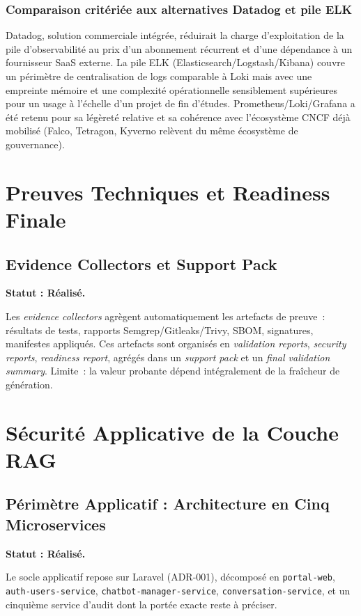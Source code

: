 \subsubsection{Comparaison critériée aux alternatives Datadog et pile ELK}
Datadog, solution commerciale intégrée, réduirait la charge d'exploitation de la pile d'observabilité au prix d'un abonnement récurrent et d'une dépendance à un fournisseur SaaS externe. La pile ELK (Elasticsearch/Logstash/Kibana) couvre un périmètre de centralisation de logs comparable à Loki mais avec une empreinte mémoire et une complexité opérationnelle sensiblement supérieures pour un usage à l'échelle d'un projet de fin d'études. Prometheus/Loki/Grafana a été retenu pour sa légèreté relative et sa cohérence avec l'écosystème CNCF déjà mobilisé (Falco, Tetragon, Kyverno relèvent du même écosystème de gouvernance).

\section{Preuves Techniques et Readiness Finale}
\label{sec:preuves_techniques}

\subsection{Evidence Collectors et Support Pack}
\textbf{Statut : Réalisé.}

Les \textit{evidence collectors} agrègent automatiquement les artefacts de preuve~: résultats de tests, rapports Semgrep/Gitleaks/Trivy, SBOM, signatures, manifestes appliqués. Ces artefacts sont organisés en \textit{validation reports}, \textit{security reports}, \textit{readiness report}, agrégés dans un \textit{support pack} et un \textit{final validation summary}. Limite~: la valeur probante dépend intégralement de la fraîcheur de génération.

\section{Sécurité Applicative de la Couche RAG}

\subsection{Périmètre Applicatif : Architecture en Cinq Microservices}
\textbf{Statut : Réalisé.}

Le socle applicatif repose sur Laravel (ADR-001), décomposé en \texttt{portal-web}, \texttt{auth-users-service}, \texttt{chatbot-manager-service}, \texttt{conversation-service}, et un cinquième service d'audit dont la portée exacte reste à préciser.

